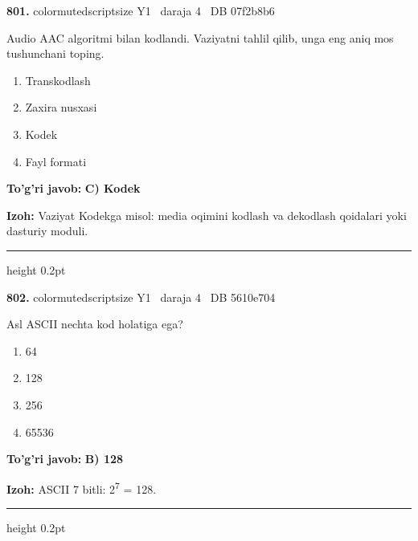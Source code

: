 \documentclass[10pt,a4paper,oneside]{article}
\begin{document}
\noindent\textbf{\color{ink}801.}  {color{muted}scriptsize Y1 \textbullet\ daraja 4 \textbullet\ DB 07f2b8b6}
\par
Audio AAC algoritmi bilan kodlandi. Vaziyatni tahlil qilib, unga eng aniq mos tushunchani toping.
\begin{enumerate}[label=\Alph*),leftmargin=9mm]
\item Transkodlash
\item Zaxira nusxasi
\item Kodek
\item Fayl formati
\end{enumerate}
\begin{tcolorbox}[enhanced,breakable,colback=teal!4,colframe=teal!50!black,boxrule=0.5pt,arc=1.1mm,left=3mm,right=3mm,top=1.7mm,bottom=1.7mm,before skip=2mm,after skip=2mm]
\textbf{\color{teal}To'g'ri javob:} \textbf{C) Kodek}
\par\smallskip
\textbf{Izoh:} Vaziyat Kodekga misol: media oqimini kodlash va dekodlash qoidalari yoki dasturiy moduli.
\end{tcolorbox}
\vspace{2mm}\hrule height 0.2pt \vspace{3mm}

\noindent\textbf{\color{ink}802.}  {color{muted}scriptsize Y1 \textbullet\ daraja 4 \textbullet\ DB 5610e704}
\par
Asl ASCII nechta kod holatiga ega?
\begin{enumerate}[label=\Alph*),leftmargin=9mm]
\item 64
\item 128
\item 256
\item 65536
\end{enumerate}
\begin{tcolorbox}[enhanced,breakable,colback=teal!4,colframe=teal!50!black,boxrule=0.5pt,arc=1.1mm,left=3mm,right=3mm,top=1.7mm,bottom=1.7mm,before skip=2mm,after skip=2mm]
\textbf{\color{teal}To'g'ri javob:} \textbf{B) 128}
\par\smallskip
\textbf{Izoh:} ASCII 7 bitli: 2\textsuperscript{7} = 128.
\end{tcolorbox}
\vspace{2mm}\hrule height 0.2pt \vspace{3mm}
\end{document}
